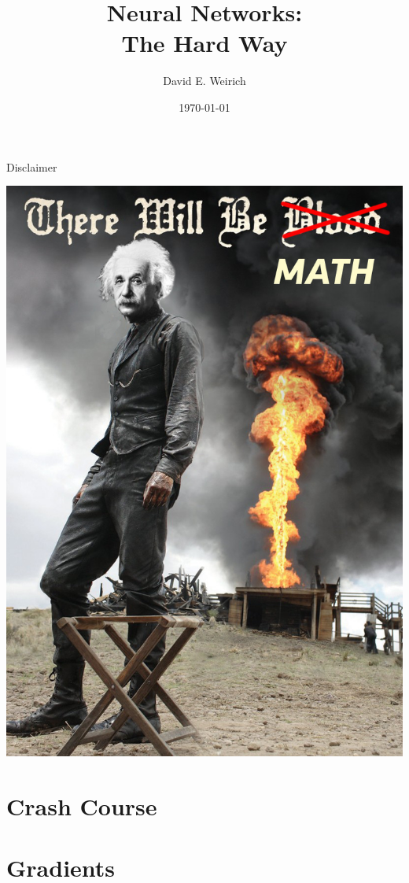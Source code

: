 \documentclass[11pt]{beamer}
\author{David E. Weirich}
\title{Neural Networks: \\ The Hard Way}
\date{\today}
\begin{document}
\begin{frame}
\titlepage
\end{frame}

\begin{frame}{Disclaimer}
\begin{center}
\includegraphics[scale=0.18]{ThereWillBeMath}
\end{center}
\end{frame}

\section{Crash Course}

\section{Gradients}
\end{document}
